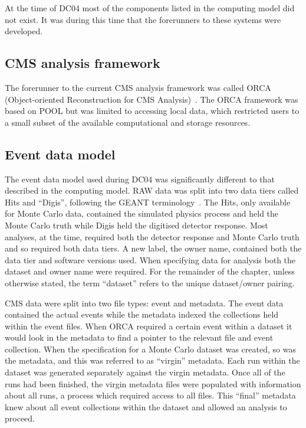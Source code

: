 
At the time of DC04 most of the components listed in the computing model did not exist. It was during this time that the forerunners to these systems were developed. 

\subsection{CMS analysis framework}
The forerunner to the current CMS analysis framework was called ORCA (Object-oriented Reconstruction for CMS Analysis)~\cite{citeulike:876402}. The ORCA framework was based on POOL but was limited to accessing local data, which restricted users to a small subset of the available computational and storage resources. %

\subsection{Event data model}
The event data model used during DC04 was significantly different to that described in the computing model. RAW data was split into two data tiers called Hits and ``Digis'', following the GEANT terminology~\cite{geant}. The Hits, only available for Monte Carlo data, contained the simulated physics process and held the Monte Carlo truth while Digis held the digitised detector response. Most analyses, at the time, required both the detector response and Monte Carlo truth and so required both data tiers. A new label, the owner name, contained both the data tier and software versions used. When specifying data for analysis both the dataset and owner name were required. For the remainder of the chapter, unless otherwise stated, the term ``dataset'' refers to the unique dataset/owner pairing. 


CMS data were split into two file types: event and metadata. The event data contained the actual events while the metadata indexed the collections held within the event files. When ORCA required a certain event within a dataset it would look in the metadata to find a pointer to the relevant file and event collection. When the specification for a Monte Carlo dataset was created, so was the metadata, and this was referred to as ``virgin'' metadata. Each run within the dataset was generated separately against the virgin metadata. Once all of the runs had been finished, the virgin metadata files were populated with information about all runs, a process which required access to all files. This ``final'' metadata knew about all event collections within the dataset and allowed an analysis to proceed.

